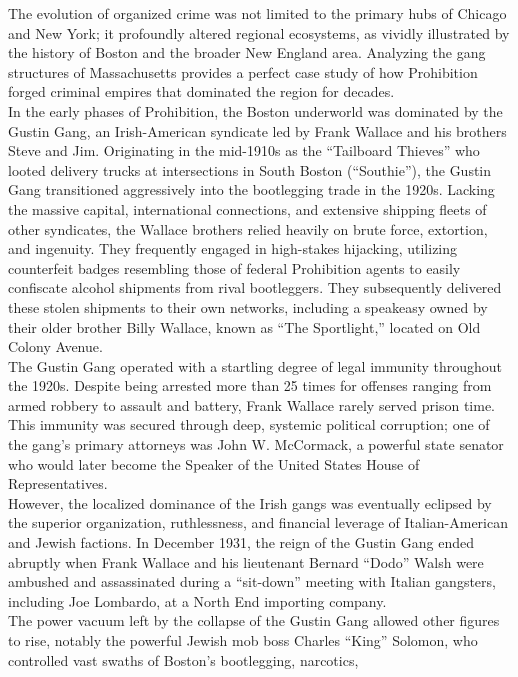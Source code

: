 \documentclass[
]{article}
\begin{document}
The evolution of organized crime was not limited to the primary hubs of
Chicago and New York; it profoundly altered regional ecosystems, as
vividly illustrated by the history of Boston and the broader New England
area. Analyzing the gang structures of Massachusetts provides a perfect
case study of how Prohibition forged criminal empires that dominated the
region for decades.\\
In the early phases of Prohibition, the Boston underworld was dominated
by the Gustin Gang, an Irish-American syndicate led by Frank Wallace and
his brothers Steve and Jim. Originating in the mid-1910s as the
``Tailboard Thieves'' who looted delivery trucks at intersections in
South Boston (``Southie''), the Gustin Gang transitioned aggressively
into the bootlegging trade in the 1920s. Lacking the massive capital,
international connections, and extensive shipping fleets of other
syndicates, the Wallace brothers relied heavily on brute force,
extortion, and ingenuity. They frequently engaged in high-stakes
hijacking, utilizing counterfeit badges resembling those of federal
Prohibition agents to easily confiscate alcohol shipments from rival
bootleggers. They subsequently delivered these stolen shipments to their
own networks, including a speakeasy owned by their older brother Billy
Wallace, known as ``The Sportlight,'' located on Old Colony Avenue.\\
The Gustin Gang operated with a startling degree of legal immunity
throughout the 1920s. Despite being arrested more than 25 times for
offenses ranging from armed robbery to assault and battery, Frank
Wallace rarely served prison time. This immunity was secured through
deep, systemic political corruption; one of the gang's primary attorneys
was John W. McCormack, a powerful state senator who would later become
the Speaker of the United States House of Representatives.\\
However, the localized dominance of the Irish gangs was eventually
eclipsed by the superior organization, ruthlessness, and financial
leverage of Italian-American and Jewish factions. In December 1931, the
reign of the Gustin Gang ended abruptly when Frank Wallace and his
lieutenant Bernard ``Dodo'' Walsh were ambushed and assassinated during
a ``sit-down'' meeting with Italian gangsters, including Joe Lombardo,
at a North End importing company.\\
The power vacuum left by the collapse of the Gustin Gang allowed other
figures to rise, notably the powerful Jewish mob boss Charles ``King''
Solomon, who controlled vast swaths of Boston's bootlegging, narcotics,
\end{document}
